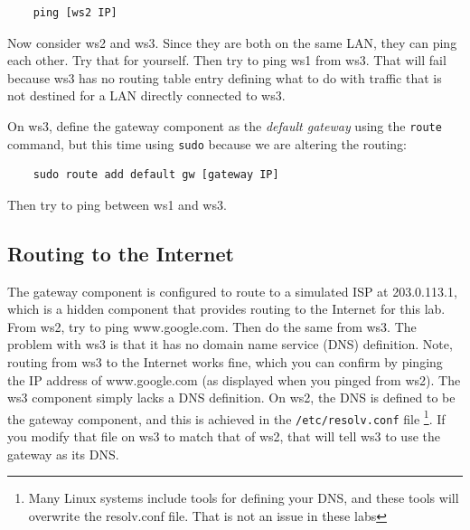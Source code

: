 \begin{verbatim}
    ping [ws2 IP]
\end{verbatim}

Now consider ws2 and ws3.  Since they are both on the same LAN, they can ping
each other.  Try that for yourself.  Then try to ping ws1 from ws3.  That will
fail because ws3 has no routing table entry defining what to do with traffic 
that is not destined for a LAN directly connected to ws3.

On ws3, define the gateway component as the \textit{default gateway} using the 
\texttt{route} command, but this time using \texttt{sudo} because we are altering the routing:

\begin{verbatim}
    sudo route add default gw [gateway IP]
\end{verbatim}
\noindent Then try to ping between ws1 and ws3. 

\subsection{Routing to the Internet}
The gateway component is configured to route to a simulated ISP at 203.0.113.1, which 
is a hidden component that provides routing to the Internet for this lab.  From ws2, 
try to ping www.google.com.  Then do the same from ws3.  The problem with ws3 is that
it has no domain name service (DNS) definition.  Note, routing from ws3 to the Internet
works fine, which you can confirm by pinging the IP address of www.google.com (as displayed
when you pinged from ws2).  The ws3 component simply lacks a DNS definition. 
On ws2, the DNS is defined to be the
gateway component, and this is achieved in the \texttt{/etc/resolv.conf} file \footnote{
Many Linux systems include tools for defining your DNS, and these tools will overwrite
the resolv.conf file.  That is not an issue in these labs}.  If you 
modify that file on ws3 to match that of ws2, that will tell ws3 to use the gateway
as its DNS.

